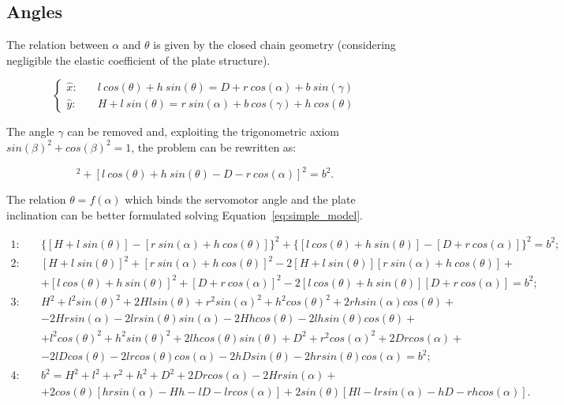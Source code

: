 \subsection{Angles}
\label{sec:angles}

The relation between $\alpha$ and $\theta$ is given by the closed chain geometry
(considering negligible the elastic coefficient of the plate structure).

\begin{equation}
\left\{
\begin{aligned}
	\hat{x}: & \quad l\ cos(\theta) + h\ sin(\theta) = D + r\ cos(\alpha) + b\ sin(\gamma)\\
	\hat{y}: & \quad H + l\ sin(\theta) = r\ sin (\alpha) + b\ cos(\gamma) + h\ cos(\theta)
\end{aligned}
\right.
\label{eq:basic_model}
\end{equation}

The angle $\gamma$ can be removed and, exploiting the trigonometric axiom
$sin(\beta)^2+cos(\beta)^2=1$, the problem can be rewritten as:

\begin{equation}
[H + l\ sin(\theta) - r\ sin (\alpha) - h\ cos(\theta)]^2 +
[l\ cos(\theta) + h\ sin(\theta) - D - r\ cos(\alpha)]^2 = b^2.
\label{eq:simple_model}
\end{equation}

The relation $\theta = f(\alpha)$ which binds the servomotor angle and the plate
inclination can be better formulated solving Equation~\ref{eq:simple_model}.

\begin{equation}
\begin{aligned}
1: \quad & \{[H + l\ sin(\theta)] - [r\ sin (\alpha) + h\ cos(\theta)]\}^2 + \{[l\ cos(\theta) + h\ sin(\theta)] - [D + r\ cos(\alpha)]\}^2 = b^2;\\
2: \quad & [H + l\ sin(\theta)]^2 + [r\ sin (\alpha) + h\ cos(\theta)]^2 - 2 [H + l\ sin(\theta)][r\ sin (\alpha) + h\ cos(\theta)] +\\
   & + [l\ cos(\theta) + h\ sin(\theta)]^2 + [D + r\ cos(\alpha)]^2 - 2 [l\ cos(\theta) + h\ sin(\theta)] [D + r\ cos(\alpha)]= b^2;\\
3: \quad & H^2 + l^2 sin(\theta)^2 + 2 H l sin(\theta) + r^2 sin (\alpha)^2 + h^2 cos(\theta)^2 + 2 r h sin (\alpha) cos(\theta) +\\
   & - 2 H r sin (\alpha) -2 l r sin(\theta) sin(\alpha) -2 H h cos(\theta) -2 l h sin(\theta) cos(\theta) +\\
   & + l^2 cos(\theta)^2 + h^2 sin(\theta)^2 + 2 l h cos(\theta) sin(\theta) + D^2 + r^2 cos(\alpha)^2 + 2 D r cos(\alpha) +\\
   & - 2 l D cos(\theta) - 2 l r cos(\theta) cos(\alpha) - 2 h D sin(\theta) -2 h r sin(\theta) cos(\alpha)= b^2;\\
4: \quad & b^2 = H^2 + l^2 + r^2  + h^2 + D^2 + 2 D r cos(\alpha) - 2 H r sin(\alpha) +\\
   & + 2 cos(\theta) [ h r sin(\alpha) - H h - l D - l r cos(\alpha) ] + 2 sin (\theta) [ H l - l r sin(\alpha) - h D - r h cos(\alpha)].
\end{aligned}
\label{eq:f_alpha}
\end{equation}

